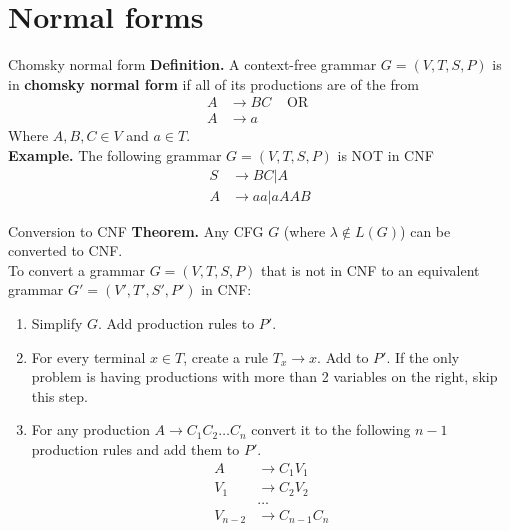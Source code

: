 \documentclass[10pt]{beamer}
\begin{document}
\section{Normal forms}

\begin{frame}{Chomsky normal form}
    \textbf{Definition.} A context-free grammar $G = (V,T,S,P)$ is in \textbf{chomsky normal form} if all of its productions are of the from
    \begin{align*}
        A & \rightarrow BC & \text{ OR } \\
        A & \rightarrow a
    \end{align*}
    Where $A,B,C \in V$ and $a \in T$.\\
    \textbf{Example.} The following grammar $G = (V,T,S,P)$ is NOT in CNF
    \begin{align*}
        S & \rightarrow BC | A    \\
        A & \rightarrow aa | aAAB
    \end{align*}
\end{frame}

\begin{frame}{Conversion to CNF}
    \textbf{Theorem.} Any CFG $G$ (where $\lambda \notin L(G)$) can be converted to CNF.\\
    To convert a grammar $G = (V,T,S,P)$ that is not in CNF to an equivalent grammar $G' = (V',T',S',P')$ in CNF:
    \begin{enumerate}
        \item Simplify $G$. Add production rules to $P'$.
        \item For every terminal $x \in T$, create a rule $T_x \rightarrow x$. Add to $P'$.  If the only problem is having productions with
              more than 2 variables on the right, skip this step.
        \item For any production $A \rightarrow C_1C_2 \dots C_n$ convert it to the following $n-1$ production rules and add them to $P'$.
              \begin{align*}
                  A       & \rightarrow C_1V_1     \\
                  V_1     & \rightarrow C_2V_2     \\
                          & \dots                  \\
                  V_{n-2} & \rightarrow C_{n-1}C_n
              \end{align*}
    \end{enumerate}
\end{frame}
\end{document}
